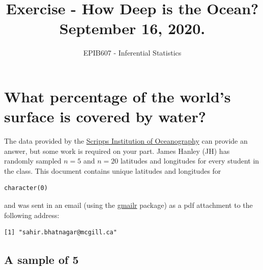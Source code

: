 \documentclass[letterpaper,12pt,twoside,]{pinp}
\title{Exercise - How Deep is the Ocean? September 16, 2020.}
\author[a]{EPIB607 - Inferential Statistics}
\affil[a]{Fall 2020, McGill University}
\begin{document}
\verticaladjustment{-2pt}

\maketitle
\thispagestyle{firststyle}



\hypertarget{what-percentage-of-the-worlds-surface-is-covered-by-water}{%
\section{What percentage of the world's surface is covered by
water?}\label{what-percentage-of-the-worlds-surface-is-covered-by-water}}

The data provided by the
\href{https://topex.ucsd.edu/cgi-bin/get_srtm30.cgi}{Scripps Institution
of Oceanography} can provide an answer, but some work is required on
your part. James Hanley (JH) has randomly sampled \(n=5\) and \(n=20\)
latitudes and longitudes for every student in the class. This document
contains unique latitudes and longitudes for

\begin{ShadedResult}
\begin{verbatim}
character(0)
\end{verbatim}
\end{ShadedResult}

and was sent in an email (using the
\href{https://cran.r-project.org/package=gmailr}{gmailr} package) as a
pdf attachment to the following address:

\begin{ShadedResult}
\begin{verbatim}
[1] "sahir.bhatnagar@mcgill.ca"
\end{verbatim}
\end{ShadedResult}

\hypertarget{a-sample-of-5}{%
\subsection*{A sample of 5}\label{a-sample-of-5}}
\end{document}
